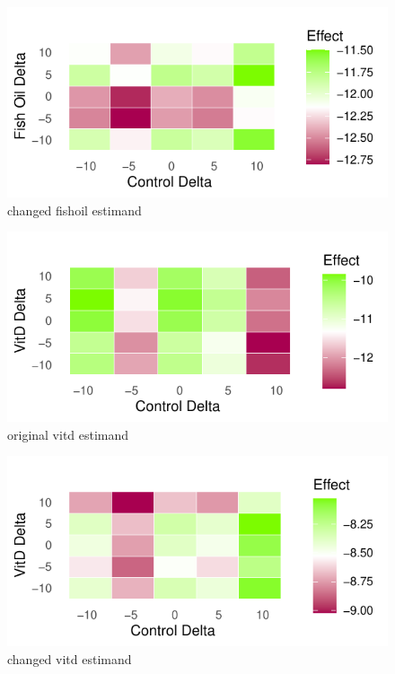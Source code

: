 \documentclass{article}
\newcommand{\pandocbounded}[1]{#1}
\begin{document}
\begin{figure}
\centering
\pandocbounded{\includegraphics[keepaspectratio]{Final_Report_files/figure-latex/unnamed-chunk-38-1.pdf}}
\caption{changed fishoil estimand}
\end{figure}

\begin{figure}
\centering
\pandocbounded{\includegraphics[keepaspectratio]{Final_Report_files/figure-latex/unnamed-chunk-39-1.pdf}}
\caption{original vitd estimand}
\end{figure}

\begin{figure}
\centering
\pandocbounded{\includegraphics[keepaspectratio]{Final_Report_files/figure-latex/unnamed-chunk-40-1.pdf}}
\caption{changed vitd estimand}
\end{figure}
\end{document}
